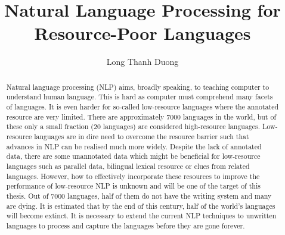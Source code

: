 
\title{Natural Language Processing for Resource-Poor Languages}
\author{Long Thanh Duong}


\maketitle
\copyrightpage


\begin{abstract}

Natural language processing (NLP) aims, broadly speaking, to teaching computer to understand human language. This is hard as computer 
must comprehend many facets of languages. It is even harder for so-called low-resource languages where the annotated resource are very limited. 
There are approximately 7000 languages in the world, but of these only a small fraction (20 languages) are considered high-resource languages. 
Low-resource languages are in dire need to overcome the resource barrier such that advances in NLP can be realised much more widely. Despite
the lack of annotated data, there are some unannotated data which might be beneficial for low-resource languages such as parallel data, bilingual 
lexical resource or clues from related languages. However, how to effectively incorporate these resources to improve the performance of 
low-resource NLP is unknown and will be one of the target of this thesis. Out of 7000 languages, half of them do not have the writing system and 
many are dying. It is estimated that by the end of this century, half of the world's languages will become extinct. It is necessary to extend the 
current NLP techniques to unwritten languages to process and capture the languages before they are gone forever. 


\end{abstract}
